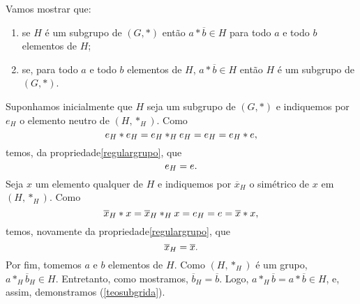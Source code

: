 \begin{dem}
  Vamos mostrar que:
  \begin{enumerate}
    \item\label{teosubgrida} se $H$ é um subgrupo de $(G,\ast )$ então
    $a\ast \overline{b}\in H$
    para todo $a$ e todo $b$ elementos de $H$;
    \item\label{teosubfrida} se, para todo $a$ e todo $b$ elementos de
    $H$, $a\ast \overline{b}\in H$ então $H$ é um subgrupo de $(G,\ast )$.
  \end{enumerate}

  Suponhamos inicialmente que $H$ seja um subgrupo de $(G,\ast )$ e
  indiquemos por $e_H$ o elemento neutro de $(H,\ast _H)$. Como
  \begin{equation*}
    e_H\ast e_H = e_H\ast_H e_H = e_H = e_H\ast e\mathrm{,}
  \end{equation*}
  temos, da propriedade\xspace\ref{regulargrupo}, que
  \begin{equation*}
    e_H = e\mathrm{.}
  \end{equation*}
  Seja $x$ um elemento qualquer de $H$ e indiquemos por $\overline{x}_H$
  o simétrico de $x$ em $(H,\ast _H)$. Como
  \begin{equation*}
    \overline{x}_H\ast x =
    \overline{x}_H\ast_H x = e_H = e = \overline{x}\ast x\mathrm{,}
  \end{equation*}
  temos, novamente da propriedade\xspace\ref{regulargrupo}, que
  \begin{equation*}
    \overline{x}_H = \overline{x}\mathrm{.}
  \end{equation*}
  Por fim, tomemos $a$ e $b$ elementos de $H$. Como $(H,\ast _H)$ é um
  grupo, $a\ast_H \overline{b}_H\in H$. Entretanto, como mostramos,
  $\overline{b}_H=\overline{b}$. Logo, $a\ast_H
  \overline{b} = a\ast \overline{b}\in H$, e, assim,
  demonstramos (\ref{teosubgrida}).


\end{dem}

